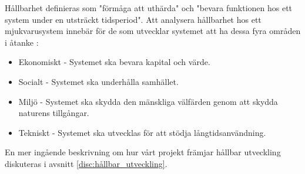 Hållbarhet definieras som "förmåga att uthärda" och "bevara funktionen hos ett system under en utsträckt tidsperiod". Att analysera hållbarhet hos ett mjukvarusystem innebär för de som utvecklar systemet att ha dessa fyra områden i åtanke \cite{lago2015framing}:

\begin{itemize}
	\item Ekonomiskt -  Systemet ska bevara kapital och värde.
	\item Socialt - Systemet ska underhålla samhället.
	\item Miljö - Systemet ska skydda den mänskliga välfärden genom att skydda naturens tillgångar.
	\item Tekniskt - Systemet ska utvecklas för att stödja långtidsanvändning.
\end{itemize}
En mer ingående beskrivning om hur vårt projekt främjar hållbar utveckling diskuteras i avsnitt \ref{disc:hållbar_utveckling}.


